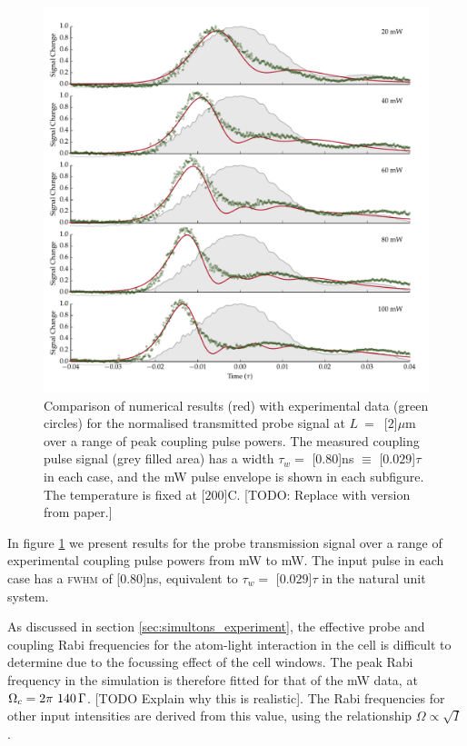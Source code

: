     \begin{figure}[p]
    \includegraphics[width=\linewidth]
      {figs/06_simultons/solve_b_multi_01_fig1.pdf}
    \caption{
    Comparison of numerical results (red) with experimental data (green circles)
    for the normalised transmitted probe signal at $L~=$~\unit[$2$]{$\mu$m} over
    a range of peak coupling pulse powers. The measured coupling pulse signal
    (grey filled area) has a width $\tau_w = $ \unit[$0.80$]{ns} $ \equiv $
    \unit[$0.029$]{$\tau$} in each case, and the \unit[100]{mW} pulse envelope
    is shown in each subfigure. The temperature is fixed at
    \unit[$200$]{\textdegree C}.
    [TODO: Replace with version from paper.]
    } 
    \label{fig:exp_result_power_dep} 
    \end{figure}
    In figure \ref{fig:exp_result_power_dep} we present results for the probe
    transmission signal over a range of experimental coupling pulse powers from
    \unit[20]{mW} to \unit[100]{mW}. The input pulse in each case has a
    \textsc{fwhm} of \unit[$0.80$]{ns}, equivalent to $\tau_w = $
    \unit[$0.029$]{$\tau$} in the natural unit system.

    As discussed in section \ref{sec:simultons_experiment}, the effective probe
    and coupling Rabi frequencies for the atom-light interaction in the cell is
    difficult to determine due to the focussing effect of the cell windows. The
    peak Rabi frequency in the simulation is therefore fitted for that of the
    \unit[100]{mW} data, at $\Omega_c = \unit[2\pi~140]{\Gamma}$. [TODO Explain
    why this is realistic]. The Rabi frequencies for other input intensities are
    derived from this value, using the relationship $\Omega \propto \sqrt{I}$.

